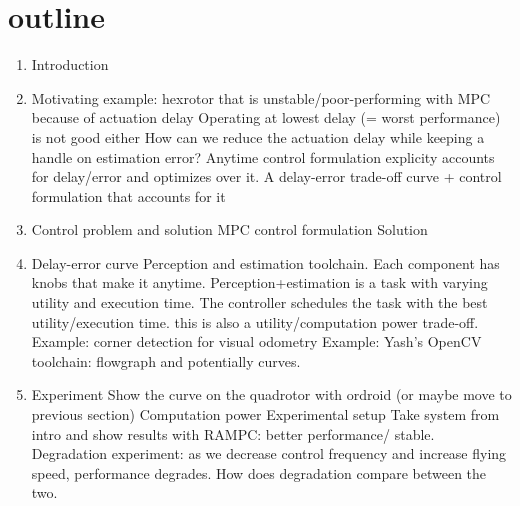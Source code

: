 \section{outline}

\begin{enumerate}
	\item Introduction
	
	\item Motivating example: 
	\subitem hexrotor that is unstable/poor-performing with MPC because of actuation delay
	\subitem Operating at lowest delay (= worst performance) is not good either 
	\subitem How can we reduce the actuation delay while keeping a handle on estimation error? 
	Anytime control formulation explicity accounts for delay/error and optimizes over it.
	\subitem A delay-error trade-off curve + control formulation that accounts for it
	
	\item Control problem and solution
	\subitem MPC control formulation 
	\subitem Solution
	
	\item Delay-error curve 
	\subitem Perception and estimation toolchain. Each component has knobs that make it anytime.
	\subitem Perception+estimation is a task with varying utility and execution time. The controller schedules the task with the best utility/execution time.
	\subitem this is also a utility/computation power trade-off.
	\subitem Example: corner detection for visual odometry
	\subitem Example: Yash's OpenCV toolchain: flowgraph and potentially curves.
	
	\item Experiment
	\subitem Show the curve on the quadrotor with ordroid (or maybe move to previous section)
	\subitem Computation power
	\subitem Experimental setup
	\subitem Take system from intro and show results with RAMPC: better performance/ stable.
	\subitem Degradation experiment: as we decrease control frequency and increase flying speed, performance degrades. How does degradation compare between the two.
	
\end{enumerate}